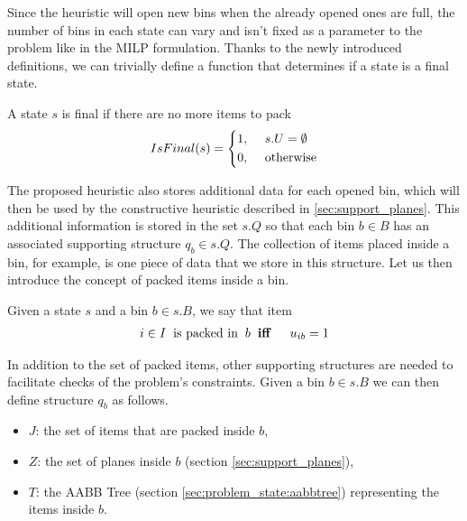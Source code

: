 Since the heuristic will open new bins when the already opened ones are full, the number of bins in each state can vary and isn't fixed as a parameter to the problem like in the MILP formulation.
Thanks to the newly introduced definitions, we can trivially define a function that determines if a state is a final state.
\begin{definition}
    \label{def:state_final}
    A state $s$ is final if there are no more items to pack
    \begin{equation}
        \label{algo:state_final}%
        IsFinal(s) = \left\{\begin{aligned}
            1,\hspace{0.5cm}& s.U = \emptyset \\
            0,\hspace{0.5cm}& \text{otherwise}
        \end{aligned}
        \right.
    \end{equation}
\end{definition}

The proposed heuristic also stores additional data for each opened bin, which will then be used by the constructive heuristic described in \cref{sec:support_planes}.
This additional information is stored in the set $s.Q$ so that each bin $b \in B$ has an associated supporting structure $q_b \in s.Q$.
The collection of items placed inside a bin, for example, is one piece of data that we store in this structure.
Let us then introduce the concept of packed items inside a bin.
\begin{definition}
    Given a state $s$ and a bin $b \in s.B$, we say that item
    \begin{equation*}
        \begin{aligned}
            i \in I \hspace{.2cm}\text{is packed in} \hspace{.2cm}b \hspace{.2cm}& \textbf{iff} \hspace{.2cm}& u_{ib} = 1
        \end{aligned}
    \end{equation*}
\end{definition}

In addition to the set of packed items, other supporting structures are needed to facilitate checks of the problem's constraints.
Given a bin $b \in s.B$ we can then define structure $q_b$ as follows.
\begin{itemize}
    \item $J$: the set of items that are packed inside $b$,
    \item $Z$: the set of planes inside $b$ (section \ref{sec:support_planes}),
    \item $T$: the AABB Tree (section \ref{sec:problem_state:aabbtree}) representing the items inside $b$.
\end{itemize}

